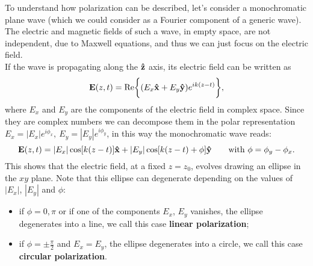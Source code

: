 To understand how polarization can be described, let's consider a monochromatic plane wave (which we could consider as a Fourier component of a generic wave). The electric and magnetic fields of such a wave, in empty space, are not independent, due to Maxwell equations, and thus we can just focus on the electric field.\\ 
If the wave is propagating along the $\mathbf{\hat{z}}$ axis, its electric field can be written as
$$ \mathbf{E}(z,t) = \text{Re}\bigg\{(E_{x}\mathbf{\hat{x}}+E_y\mathbf{\hat{y}})e^{ik(z-t)}\bigg\},$$
where $E_x$ and $E_y$ are the components of the electric field in complex space. Since they are complex numbers we can decompose them in the polar representation $E_x=|E_x|e^{i\phi_x},\ E_y=|E_y|e^{i\phi_y}$, in this way the monochromatic wave reads:
$$ \mathbf{E}(z,t) = |E_x|\cos[k(z-t)]\versor x+|E_y|\cos[k(z-t)+\phi]\versor y \qquad\text{with}\ \phi=\phi_y-\phi_x.$$
This shows that the electric field, at a fixed $z=z_0$, evolves drawing an ellipse in the $xy$ plane. Note that this ellipse can degenerate depending on the values of $|E_x|$, $|E_y|$ and $\phi$:
\begin{itemize}
    \item if $\phi=0,\pi$ or if one of the components $E_x$, $E_y$ vanishes, the ellipse degenerates into a line, we call this case \textbf{linear polarization};
    \item if $\phi=\pm\frac{\pi}{2}$ and $E_x=E_y$, the ellipse degenerates into a circle, we call this case \textbf{circular polarization}.
\end{itemize}
